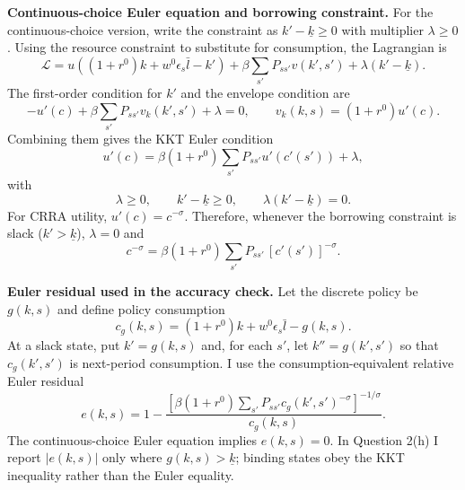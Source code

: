 \documentclass[11pt]{article}
\begin{document}
\textbf{Continuous-choice Euler equation and borrowing constraint.}
For the continuous-choice version, write the constraint as
$k'-\underline{k}\ge0$ with multiplier $\lambda\ge0$.  Using the resource
constraint to substitute for consumption, the Lagrangian is
\[
\mathcal L=u\!\left((1+r^0)k+w^0\epsilon_s\bar l-k'\right)
+\beta\sum_{s'}P_{ss'}v(k',s')+\lambda(k'-\underline{k}).
\]
The first-order condition for $k'$ and the envelope condition are
\[
-u'(c)+\beta\sum_{s'}P_{ss'}v_k(k',s')+\lambda=0,
\qquad
v_k(k,s)=(1+r^0)u'(c).
\]
Combining them gives the KKT Euler condition
\[
\boxed{\quad
u'(c)=\beta(1+r^0)\sum_{s'}P_{ss'}u'(c'(s'))+\lambda,
\quad}
\]
with
\[
\lambda\ge0,\qquad k'-\underline{k}\ge0,\qquad
\lambda(k'-\underline{k})=0.
\]
For CRRA utility, $u'(c)=c^{-\sigma}$.  Therefore, whenever the borrowing
constraint is slack ($k'>\underline{k}$), $\lambda=0$ and
\[
c^{-\sigma}=\beta(1+r^0)\sum_{s'}P_{ss'}\,[c'(s')]^{-\sigma}.
\]

\textbf{Euler residual used in the accuracy check.}
Let the discrete policy be $g(k,s)$ and define policy consumption
\[
c_g(k,s)=(1+r^0)k+w^0\epsilon_s\bar l-g(k,s).
\]
At a slack state, put $k'=g(k,s)$ and, for each $s'$, let
$k''=g(k',s')$ so that $c_g(k',s')$ is next-period consumption.  I use the
consumption-equivalent relative Euler residual
\[
\boxed{\quad
e(k,s)=1-
\frac{\left[\beta(1+r^0)\sum_{s'}P_{ss'}c_g(k',s')^{-\sigma}\right]^{-1/\sigma}}
{c_g(k,s)}.
\quad}
\]
The continuous-choice Euler equation implies $e(k,s)=0$.  In Question 2(h) I
report $|e(k,s)|$ only where $g(k,s)>\underline{k}$; binding states obey the
KKT inequality rather than the Euler equality.
\end{document}
